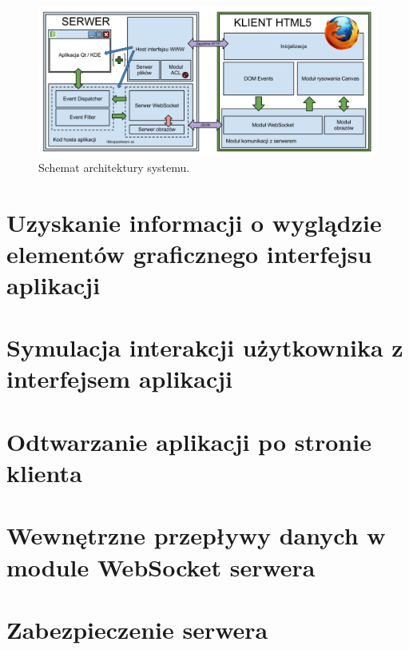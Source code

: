 \begin{figure}
\centering
\includegraphics[width=1.0\linewidth]{img/arch}
\caption{Schemat architektury systemu.}
\label{fig:arch}
\end{figure}



\section{Uzyskanie informacji o wyglądzie elementów graficznego interfejsu aplikacji}


\section{Symulacja interakcji użytkownika z interfejsem aplikacji}


\section{Odtwarzanie aplikacji po stronie klienta}


\section{Wewnętrzne przepływy danych w module WebSocket serwera}


\section{Zabezpieczenie serwera}


